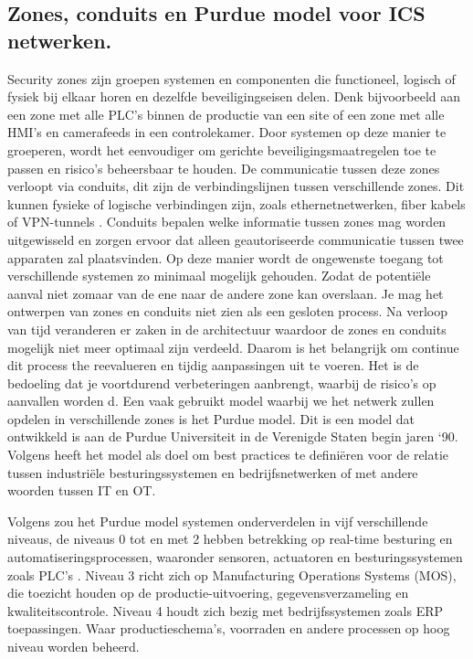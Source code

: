 \subsection{Zones, conduits en Purdue model voor ICS netwerken.}
Security zones zijn groepen systemen en componenten die functioneel, logisch of fysiek bij elkaar horen en dezelfde beveiligingseisen delen. Denk bijvoorbeeld aan een zone met alle PLC’s binnen de productie van een site of een zone met alle HMI’s en camerafeeds in een controlekamer. Door systemen op deze manier te groeperen, wordt het eenvoudiger om gerichte beveiligingsmaatregelen toe te passen en risico’s beheersbaar te houden. De communicatie tussen deze zones verloopt via conduits, dit zijn de verbindingslijnen tussen verschillende zones. Dit kunnen fysieke of logische verbindingen zijn, zoals ethernetnetwerken, fiber kabels of VPN-tunnels . Conduits bepalen welke informatie tussen zones mag worden uitgewisseld en zorgen ervoor dat alleen geautoriseerde communicatie tussen twee apparaten zal plaatsvinden. Op deze manier wordt de ongewenste toegang tot verschillende systemen zo minimaal mogelijk gehouden. Zodat de potentiële aanval niet zomaar van de ene naar de andere zone kan overslaan. \autocite{Dragos2023}
Je mag het ontwerpen van zones en conduits niet zien als een gesloten process. Na verloop van tijd veranderen er zaken in de architectuur waardoor de zones en conduits mogelijk niet meer optimaal zijn verdeeld. Daarom is het belangrijk om continue dit process the reevalueren en tijdig aanpassingen uit te voeren. Het is de bedoeling dat je voortdurend verbeteringen aanbrengt, waarbij de risico's op aanvallen worden d. \autocite{Incibe2018}
Een vaak gebruikt model waarbij we het netwerk zullen opdelen in verschillende zones is het Purdue model. Dit is een model dat ontwikkeld is aan de Purdue Universiteit in de Verenigde Staten begin jaren `90. Volgens \textcite{Mathezer2021}heeft het model als doel om best practices te definiëren voor de relatie tussen industriële besturingssystemen en bedrijfsnetwerken of met andere woorden tussen IT en OT. 

\vspace{5mm}
Volgens \textcite{Commers2025} zou het Purdue model systemen onderverdelen in vijf verschillende niveaus, de niveaus 0 tot en met 2 hebben betrekking op real-time besturing en automatiseringsprocessen, waaronder sensoren, actuatoren en besturingssystemen zoals PLC’s . Niveau 3 richt zich op Manufacturing Operations Systems (MOS), die toezicht houden op de productie-uitvoering, gegevensverzameling en kwaliteitscontrole. Niveau 4 houdt zich bezig met bedrijfssystemen zoals ERP toepassingen. Waar productieschema's, voorraden en andere processen op hoog niveau worden beheerd.

